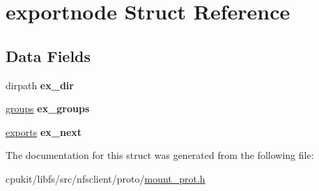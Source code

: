 \hypertarget{structexportnode}{}\section{exportnode Struct Reference}
\label{structexportnode}
\subsection*{Data Fields}
\begin{DoxyCompactItemize}
\item 
\mbox{\label{structexportnode_a5a109564da2d563cf64db50ac08d19d5}} 
dirpath {\bfseries ex\+\_\+dir}
\item 
\mbox{\label{structexportnode_ac5ffb1831ff2570b4ddb3451ff845441}} 
\mbox{\hyperlink{structgroupnode}{groups}} {\bfseries ex\+\_\+groups}
\item 
\mbox{\label{structexportnode_a8176045f3b307f24e5bcd9d22541c778}} 
\mbox{\hyperlink{structexportnode}{exports}} {\bfseries ex\+\_\+next}
\end{DoxyCompactItemize}


The documentation for this struct was generated from the following file\+:\begin{DoxyCompactItemize}
\item 
cpukit/libfs/src/nfsclient/proto/\mbox{\hyperlink{mount__prot_8h}{mount\+\_\+prot.\+h}}\end{DoxyCompactItemize}
